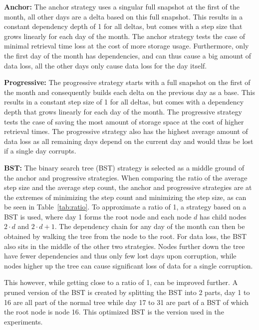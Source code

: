 \textbf{Anchor:} The anchor strategy uses a singular full snapshot at the first of the month, all other days are a delta based 
on this full snapshot. This results in a constant dependency depth of 1 for all deltas, but comes with a step size 
that grows linearly for each day of the month. The anchor strategy tests the case of minimal retrieval time loss 
at the cost of more storage usage. Furthermore, only the first day of the month has dependencies, and can thus 
cause a big amount of data loss, all the other days only cause data loss for the day itself.

\textbf{Progressive:} The progressive strategy starts with a full snapshot on the first of the month and consequently builds each delta on the 
previous day as a base. This results in a constant step size of 1 for all deltas, but comes with a dependency depth that 
grows linearly for each day of the month. The progressive strategy tests the case of saving the most amount of storage space
at the cost of higher retrieval times. The progressive strategy also has the highest average amount of data loss
as all remaining days depend on the current day and would thus be lost if a single day corrupts.

\textbf{BST:} The binary search tree (BST) strategy is selected as a middle ground of the anchor and progressive strategies.
When comparing the ratio of the average step size and the average step count, the anchor and progressive strategies 
are at the extremes of minimizing the step count and minimizing the step size, as can be seen in Table~\ref{tab:ratio}. 
To approximate a ratio of 1, a strategy based on a BST is used, where day 1 forms the root node and each node $d$ has 
child nodes $2 \cdot d$ and $2 \cdot d + 1$. The dependency chain for any day of the month can then be obtained by walking 
the tree from the node to the root. For data loss, the BST also sits in the middle of the other two strategies. Nodes 
further down the tree have fewer dependencies and thus only few lost days upon corruption, while nodes higher up the tree 
can cause significant loss of data for a single corruption.

% 
This however, while getting close to a ratio of 1, can be improved further. A pruned version of the BST is created 
by splitting the BST into 2 parts, day 1 to 16 are all part of the normal tree while day 17 to 31 are part of a BST 
of which the root node is node 16. This optimized BST is the version used in the experiments.


